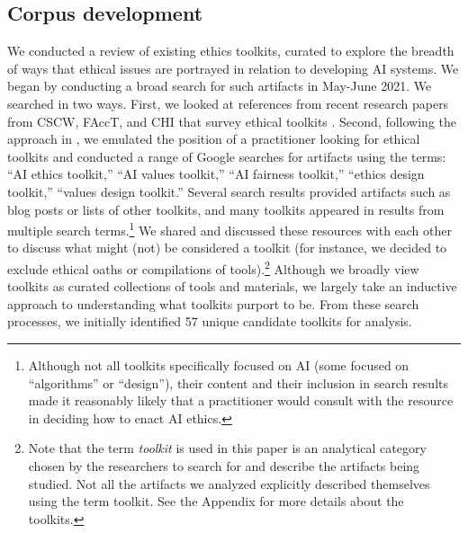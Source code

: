 \documentclass[acmsmall]{acmart}
\begin{document}
\subsection{Corpus development}
We conducted a review of existing ethics toolkits, curated to explore the breadth of ways that ethical issues are portrayed in relation to developing AI systems. We began by conducting a broad search for such artifacts in May-June 2021. We searched in two ways. First, we looked at references from recent research papers from CSCW, FAccT, and CHI that survey ethical toolkits \cite[e.g.,][]{lee2021landscape,richardson2021towards}. Second, following the approach in \citet{lee2021landscape}, we emulated the position of a practitioner looking for ethical toolkits and conducted a range of Google searches for artifacts using the terms: ``AI ethics toolkit,'' ``AI values toolkit,'' ``AI fairness toolkit,'' ``ethics design toolkit,'' ``values design toolkit.'' Several search results provided artifacts such as blog posts or lists of other toolkits, and many toolkits appeared in results from multiple search terms.\footnote{Although not all toolkits specifically focused on AI (some focused on ``algorithms'' or ``design''), their content and their inclusion in search results made it reasonably likely that a practitioner would consult with the resource in deciding how to enact AI ethics.}
We shared and discussed these resources with each other to discuss what might (not) be considered a toolkit (for instance, we decided to exclude ethical oaths or compilations of tools).\footnote{Note that the term \textit{toolkit} is used in this paper is an analytical category chosen by the researchers to search for and describe the artifacts being studied. Not all the artifacts we analyzed explicitly described themselves using the term toolkit. See the Appendix for more details about the toolkits.}
Although we broadly view toolkits as curated collections of tools and materials, we largely take an inductive approach to understanding what toolkits purport to be.
From these search processes, we initially identified 57 unique candidate toolkits for analysis.
\end{document}
